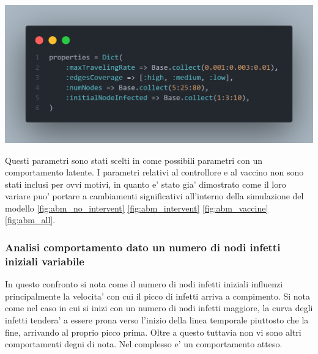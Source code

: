 \begin{minipage}{\linewidth}
	\centering
	\includegraphics[width=\textwidth]{img/paramscan.png}
	\label{fig:paramscan}
\end{minipage}

Questi parametri sono stati scelti in come possibili parametri con un comportamento latente. I parametri 
relativi al controllore e al vaccino non sono stati inclusi per ovvi motivi, in quanto e' stato gia' dimostrato 
come il loro variare puo' portare a cambiamenti significativi all'interno della simulazione del modello 
\ref{fig:abm_no_intervent} \ref{fig:abm_intervent} \ref{fig:abm_vaccine} \ref{fig:abm_all}.
\newpage

\subsubsection{Analisi comportamento dato un numero di nodi infetti iniziali variabile}
In questo confronto si nota come il numero di nodi infetti iniziali influenzi principalmente la velocita' con cui 
il picco di infetti arriva a compimento. Si nota come nel caso in cui si inizi con un numero di nodi infetti maggiore, 
la curva degli infetti tendera' a essere prona verso l'inizio della linea temporale piuttosto che la fine, arrivando 
al proprio picco prima. Oltre a questo tuttavia non vi sono altri comportamenti degni di nota. Nel complesso e' un
comportamento atteso.

